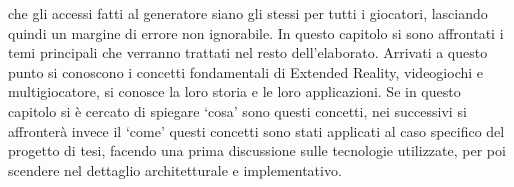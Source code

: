             che gli accessi fatti al generatore siano gli stessi per tutti i giocatori, lasciando quindi un margine di errore non ignorabile.
    \newline \newline
    In questo capitolo si sono affrontati i temi principali che verranno trattati nel resto dell'elaborato. Arrivati a questo punto si conoscono i concetti fondamentali di 
    Extended Reality, videogiochi e multigiocatore, si conosce la loro storia e le loro applicazioni. Se in questo capitolo si è cercato di spiegare `cosa' sono questi concetti, 
    nei successivi si affronterà invece il `come' questi concetti sono stati applicati al caso specifico del progetto di tesi, facendo una prima discussione sulle tecnologie
    utilizzate, per poi scendere nel dettaglio architetturale e implementativo.